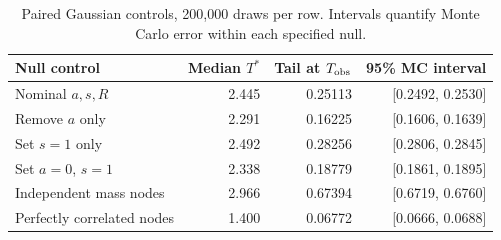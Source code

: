 \begin{table}[H]\centering\small
\begin{tabular}{lrrr}\toprule
Null control & Median $T^*$ & Tail at $T_{\rm obs}$ & 95\% MC interval\\\midrule
Nominal $a,s,R$ & 2.445 & 0.25113 & [0.2492, 0.2530]\\
Remove $a$ only & 2.291 & 0.16225 & [0.1606, 0.1639]\\
Set $s=1$ only & 2.492 & 0.28256 & [0.2806, 0.2845]\\
Set $a=0$, $s=1$ & 2.338 & 0.18779 & [0.1861, 0.1895]\\
Independent mass nodes & 2.966 & 0.67394 & [0.6719, 0.6760]\\
Perfectly correlated nodes & 1.400 & 0.06772 & [0.0666, 0.0688]\\
\bottomrule\end{tabular}
\caption{Paired Gaussian controls, 200,000 draws per row. Intervals quantify Monte Carlo error within each specified null.}\end{table}
